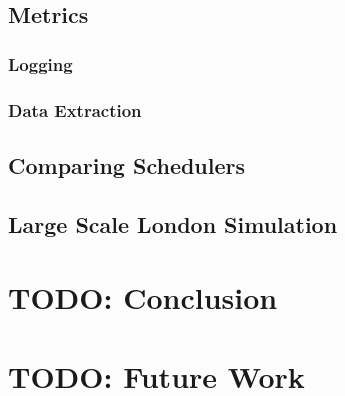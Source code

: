 \documentclass[a4paper,12pt,titlepage]{article}
\begin{document}
\subsection{Metrics}
\subsubsection{Logging}
\subsubsection{Data Extraction}

\subsection{Comparing Schedulers}

\subsection{Large Scale London Simulation}

\newpage
\section{TODO: Conclusion}

\newpage
\section{TODO: Future Work}
\end{document}
